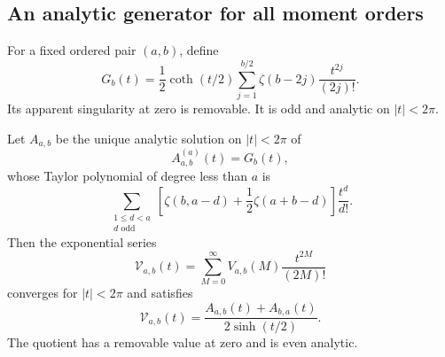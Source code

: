 \subsection{An analytic generator for all moment orders}

For a fixed ordered pair $(a,b)$, define
\begin{equation}\label{mt:G}
 G_b(t)=\frac12\coth(t/2)
             \sum_{j=1}^{b/2}\zeta(b-2j)\frac{t^{2j}}{(2j)!}.
\end{equation}
Its apparent singularity at zero is removable. It is odd and analytic
on $|t|<2\pi$.

\begin{theorem}
\label{mt:generator}
Let $A_{a,b}$ be the unique analytic solution on $|t|<2\pi$ of
\begin{equation}\label{mt:generator-ode}
 A_{a,b}^{(a)}(t)=G_b(t),
\end{equation}
whose Taylor polynomial of degree less than $a$ is
\begin{equation}\label{mt:initial-data}
 \sum_{\substack{1\le d<a\\d\text{ odd}}}
  \left[\zeta(b,a-d)+\frac12\zeta(a+b-d)\right]\frac{t^d}{d!}.
\end{equation}
Then the exponential series
\begin{equation}\label{mt:moment-egf}
 \mathscr V_{a,b}(t)=\sum_{M=0}^{\infty}
                      V_{a,b}(M)\frac{t^{2M}}{(2M)!}
\end{equation}
converges for $|t|<2\pi$ and satisfies
\begin{equation}\label{mt:generator-formula}
 \boxed{\displaystyle
 \mathscr V_{a,b}(t)=
       \frac{A_{a,b}(t)+A_{b,a}(t)}{2\sinh(t/2)}.}
\end{equation}
The quotient has a removable value at zero and is even analytic.
\end{theorem}

